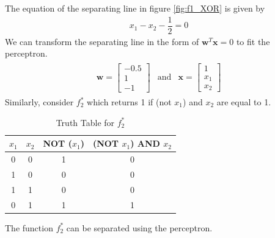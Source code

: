 \noindent The equation of the separating line in figure \ref{fig:f1_XOR} is given by
\begin{align}
  x_1 - x_2 - \dfrac{1}{2} = 0
\end{align}
We can transform the separating line in the form of $\textbf{w}^T\textbf{x} = 0$ to fit the perceptron.
\begin{align}
  \label{eq: weight_f_1}
  \begin{matrix}
    \textbf{w} = \begin{bmatrix}
      -0.5 \\
      1 \\
      -1
    \end{bmatrix} & \text{and} & \textbf{x} = \begin{bmatrix}
      1 \\
      x_1 \\
      x_2
    \end{bmatrix}
  \end{matrix}
\end{align}
Similarly, consider $f_2^{*}$ which returns 1 if (not $x_1$) and $x_2$ are equal to 1.
\begin{table}[H]
  \begin{center}
    \begin{tabular}{ c c c c}
      $x_1$ & $x_2$ & NOT ($x_1$) & (NOT $x_1$) AND $x_2$ \\
     \hline 
      0 & 0 & 1 & 0 \\  
      1 & 0 & 0 & 0 \\  
      1 & 1 & 0 & 0 \\  
      0 & 1 & 1 & 1 
    \end{tabular}
    \caption{Truth Table for $f_2^{*}$}
  \label{table:truth_table_f_2}
  \end{center}  
\end{table}
\noindent The function $f_2^{*}$ can be separated using the perceptron.
